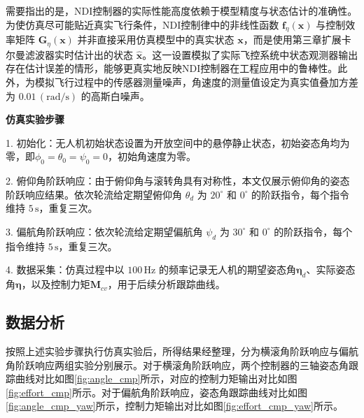 需要指出的是，NDI控制器的实际性能高度依赖于模型精度与状态估计的准确性。为使仿真尽可能贴近真实飞行条件，NDI控制律中的非线性函数 \(\boldsymbol{f}_{\eta}(\boldsymbol{x})\) 与控制效率矩阵 \(\boldsymbol{G}_{\eta}(\boldsymbol{x})\) 并非直接采用仿真模型中的真实状态 \(\boldsymbol{x}\)，而是使用第三章扩展卡尔曼滤波器实时估计出的状态 \(\hat{\boldsymbol{x}}\)。这一设置模拟了实际飞控系统中状态观测器输出存在估计误差的情形，能够更真实地反映NDI控制器在工程应用中的鲁棒性。此外，为模拟飞行过程中的传感器测量噪声，角速度的测量值设定为真实值叠加方差为 \(0.01\,\mathrm{(rad/s)}\) 的高斯白噪声。

\textbf{仿真实验步骤}

1. 初始化：无人机初始状态设置为开放空间中的悬停静止状态，初始姿态角均为零，即\(\phi_0 = \theta_0 = \psi_0 = 0\)，初始角速度为零。

2. 俯仰角阶跃响应：由于俯仰角与滚转角具有对称性，本文仅展示俯仰角的姿态阶跃响应结果。依次轮流给定期望俯仰角 \(\theta_d\) 为 \(20^\circ\) 和 \(0^\circ\) 的阶跃指令，每个指令维持 \(5\,\mathrm{s}\)，重复三次。

3. 偏航角阶跃响应：依次轮流给定期望偏航角 \(\psi_d\) 为 \(30^\circ\) 和 \(0^\circ\) 的阶跃指令，每个指令维持 \(5\,\mathrm{s}\)，重复三次。

 4. 数据采集：仿真过程中以 \(100\,\mathrm{Hz}\) 的频率记录无人机的期望姿态角\(\boldsymbol{\eta}_d\)、实际姿态角\(\boldsymbol{\eta}\)，以及控制力矩\(\boldsymbol{M}_{cv}\)，用于后续分析跟踪曲线。

 \subsection{数据分析}
按照上述实验步骤执行仿真实验后，所得结果经整理，分为横滚角阶跃响应与偏航角阶跃响应两组实验分别展示。对于横滚角阶跃响应，两个控制器的三轴姿态角跟踪曲线对比如图\ref{fig:angle_cmp}所示，对应的控制力矩输出对比如图\ref{fig:effort_cmp}所示。对于偏航角阶跃响应，姿态角跟踪曲线对比如图\ref{fig:angle_cmp_yaw}所示，控制力矩输出对比如图\ref{fig:effort_cmp_yaw}所示。

